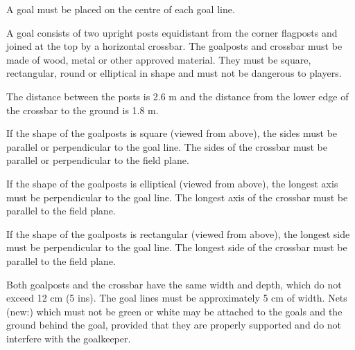 A goal must be placed on the centre of each goal line.


\bigskip

A goal consists of two upright posts equidistant from the corner flagposts and joined at the top by a horizontal crossbar. The goalposts and crossbar must be made of wood, metal or other approved material. They must be square, rectangular, round or elliptical in shape and must
not be dangerous to players.

\bigskip

The distance between the posts is 2.6 m and the distance from the lower edge of the crossbar to the ground is 1.8 m. 


\bigskip


\bigskip


\bigskip

If the shape of the goalposts is square (viewed from above), the sides must be parallel or perpendicular to the goal line. The sides of the crossbar must be parallel or perpendicular to the field plane.

\bigskip

If the shape of the goalposts is elliptical (viewed from above), the longest axis must be perpendicular to the goal line. The longest axis of the crossbar must be parallel to the field plane.

\bigskip

If the shape of the goalposts is rectangular (viewed from above), the longest side must be perpendicular to the goal line. The longest side of the crossbar must be parallel to the field plane.

\bigskip

Both goalposts and the crossbar have the same width and depth, which do not exceed 12 cm (5 ins).
The goal lines must be approximately 5 cm of width. 
Nets (new:) which must not be green or white may be attached to the goals and the ground behind the goal, provided that they are properly supported and do not interfere with the goalkeeper. 

